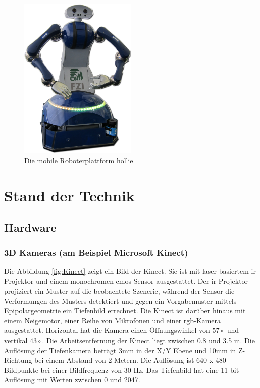 \begin{figure}[h]
	\center
	\includegraphics[width=0.5\textwidth]{graphics/hollie}
	\caption{\label{fig:hollie} Die mobile Roboterplattform \gls{hollie}}
\end{figure}



\section{Stand der Technik}
\label{stand_der_technik_sec}
\authorsection{\editorabel}

\subsection{Hardware}

\subsubsection{3D Kameras (am Beispiel Microsoft Kinect)}
Die Abbildung \ref{fig:Kinect} zeigt ein Bild der Kinect.
Sie ist mit laser-basiertem \gls{ir} Projektor und einem monochromen \gls{cmos} Sensor ausgestattet.
Der \gls{ir}-Projektor projiziert ein Muster auf die beobachtete Szenerie, während der  Sensor die Verformungen des Musters detektiert und gegen ein Vorgabemuster mittels Epipolargeometrie ein Tiefenbild errechnet.
Die Kinect ist darüber hinaus mit einem Neigemotor, einer Reihe von Mikrofonen und einer \gls{rgb}-Kamera ausgestattet.
Horizontal hat die Kamera einen Öffnungswinkel von $57\circ$ und vertikal $43\circ$.
Die Arbeitsentfernung der Kinect liegt zwischen 0.8 und 3.5 m.
Die Auflösung der Tiefenkamera beträgt 3mm in der X/Y Ebene und 10mm in Z-Richtung bei einem Abstand von 2 Metern.
Die Auflösung ist 640 x 480 Bildpunkte bei einer Bildfrequenz von 30 Hz.
Das Tiefenbild hat eine 11 bit Auflösung mit Werten zwischen 0 und 2047.

